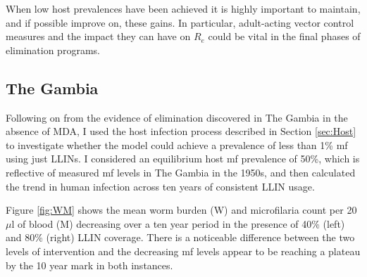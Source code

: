 When low host prevalences have been achieved it is highly important to maintain, and if possible improve on, these gains. In particular, adult-acting vector control measures and the impact they can have on $R_e$ could be vital in the final phases of elimination programs. 

\subsection{The Gambia}

Following on from the evidence of elimination discovered in The Gambia in the absence of MDA, I used the host infection process described in Section \ref{sec:Host} to investigate whether the model could achieve a prevalence of less than 1\% mf using just LLINs. I considered an equilibrium host mf prevalence of 50\%, which is reflective of measured mf levels in The Gambia in the 1950s, and then calculated the trend in human infection across ten years of consistent LLIN usage.

Figure \ref{fig:WM} shows the mean worm burden (W) and microfilaria count per 20$\mu$l of blood (M) decreasing over a ten year period in the presence of 40\% (left) and 80\% (right) LLIN coverage. There is a noticeable difference between the two levels of intervention and the decreasing mf levels appear to be reaching a plateau by the 10 year mark in both instances.

